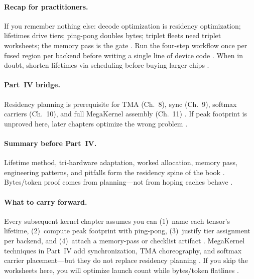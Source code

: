 \paragraph{Recap for practitioners.}
If you remember nothing else: decode optimization is residency optimization; lifetimes drive tiers; ping-pong doubles bytes; triplet fleets need triplet worksheets; the memory pass is the gate \citep{dao2022flashattention,patel2025llminference,yirage2026,taxbreak2026,memoryfloor2026}.
Run the four-step workflow once per fused region per backend before writing a single line of device code \citep{chen2020compilerbasedhardw,rotem2018glow}.
When in doubt, shorten lifetimes via scheduling before buying larger chips \citep{wu2024mirage,taxbreak2026}.

\paragraph{Part~IV bridge.}
Residency planning is prerequisite for TMA (Ch.~8), sync (Ch.~9), softmax carriers (Ch.~10), and full MegaKernel assembly (Ch.~11) \citep{dao2022flashattention,semianalysis2024tma,yirage2026}.
If peak footprint is unproved here, later chapters optimize the wrong problem \citep{taxbreak2026,memoryfloor2026}.

\paragraph{Summary before Part~IV.}
Lifetime method, tri-hardware adaptation, worked allocation, memory pass, engineering patterns, and pitfalls form the residency spine of the book \citep{dlbook,chen2020compilerbasedhardw,yirage2026,dao2022flashattention,patel2025llminference,amd2024xdna,nvidia2022hopper,taxbreak2026,memoryfloor2026,wu2024mirage,rotem2018glow,mpk2025}.
Bytes/token proof comes from planning---not from hoping caches behave \citep{memoryfloor2026,taxbreak2026}.

\paragraph{What to carry forward.}
Every subsequent kernel chapter assumes you can (1)~name each tensor's lifetime, (2)~compute peak footprint with ping-pong, (3)~justify tier assignment per backend, and (4)~attach a memory-pass or checklist artifact \citep{yirage2026,chen2020compilerbasedhardw,patel2025llminference}.
MegaKernel techniques in Part~IV add synchronization, TMA choreography, and softmax carrier placement---but they do not replace residency planning \citep{semianalysis2024tma,dao2022flashattention,taxbreak2026}.
If you skip the worksheets here, you will optimize launch count while bytes/token flatlines \citep{memoryfloor2026,taxbreak2026}.

